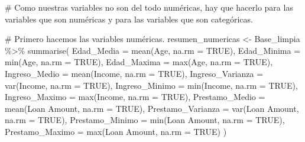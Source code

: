 \documentclass[
  letterpaper,
  DIV=11,
  numbers=noendperiod]{scrreprt}
\newenvironment{Shaded}{\begin{snugshade}}{\end{snugshade}}
\newcommand{\AttributeTok}[1]{\textcolor[rgb]{0.40,0.45,0.13}{#1}}
\newcommand{\CommentTok}[1]{\textcolor[rgb]{0.37,0.37,0.37}{#1}}
\newcommand{\ConstantTok}[1]{\textcolor[rgb]{0.56,0.35,0.01}{#1}}
\newcommand{\FunctionTok}[1]{\textcolor[rgb]{0.28,0.35,0.67}{#1}}
\newcommand{\NormalTok}[1]{\textcolor[rgb]{0.00,0.23,0.31}{#1}}
\newcommand{\OtherTok}[1]{\textcolor[rgb]{0.00,0.23,0.31}{#1}}
\newcommand{\SpecialCharTok}[1]{\textcolor[rgb]{0.37,0.37,0.37}{#1}}
\newcommand{\StringTok}[1]{\textcolor[rgb]{0.13,0.47,0.30}{#1}}
\begin{document}
\begin{Shaded}
\begin{Highlighting}[]
\CommentTok{\# Como nuestras variables no son del todo numéricas, hay que hacerlo para las variables que son numéricas y para las variables que son categóricas. }

\CommentTok{\# Primero hacemos las variables numéricas.}
\NormalTok{resumen\_numericas }\OtherTok{\textless{}{-}}\NormalTok{ Base\_limpia }\SpecialCharTok{\%\textgreater{}\%}
  \FunctionTok{summarise}\NormalTok{(}
    \AttributeTok{Edad\_Media =} \FunctionTok{mean}\NormalTok{(Age, }\AttributeTok{na.rm =} \ConstantTok{TRUE}\NormalTok{),}
    \AttributeTok{Edad\_Minima =} \FunctionTok{min}\NormalTok{(Age, }\AttributeTok{na.rm =} \ConstantTok{TRUE}\NormalTok{),}
    \AttributeTok{Edad\_Maxima =} \FunctionTok{max}\NormalTok{(Age, }\AttributeTok{na.rm =} \ConstantTok{TRUE}\NormalTok{),}
    \AttributeTok{Ingreso\_Medio =} \FunctionTok{mean}\NormalTok{(Income, }\AttributeTok{na.rm =} \ConstantTok{TRUE}\NormalTok{),}
    \AttributeTok{Ingreso\_Varianza =} \FunctionTok{var}\NormalTok{(Income, }\AttributeTok{na.rm =} \ConstantTok{TRUE}\NormalTok{),}
    \AttributeTok{Ingreso\_Minimo =} \FunctionTok{min}\NormalTok{(Income, }\AttributeTok{na.rm =} \ConstantTok{TRUE}\NormalTok{),}
    \AttributeTok{Ingreso\_Maximo =} \FunctionTok{max}\NormalTok{(Income, }\AttributeTok{na.rm =} \ConstantTok{TRUE}\NormalTok{),}
    \AttributeTok{Prestamo\_Medio =} \FunctionTok{mean}\NormalTok{(}\StringTok{\textasciigrave{}}\AttributeTok{Loan Amount}\StringTok{\textasciigrave{}}\NormalTok{, }\AttributeTok{na.rm =} \ConstantTok{TRUE}\NormalTok{),}
    \AttributeTok{Prestamo\_Varianza =} \FunctionTok{var}\NormalTok{(}\StringTok{\textasciigrave{}}\AttributeTok{Loan Amount}\StringTok{\textasciigrave{}}\NormalTok{, }\AttributeTok{na.rm =} \ConstantTok{TRUE}\NormalTok{),}
    \AttributeTok{Prestamo\_Minimo =} \FunctionTok{min}\NormalTok{(}\StringTok{\textasciigrave{}}\AttributeTok{Loan Amount}\StringTok{\textasciigrave{}}\NormalTok{, }\AttributeTok{na.rm =} \ConstantTok{TRUE}\NormalTok{),}
    \AttributeTok{Prestamo\_Maximo =} \FunctionTok{max}\NormalTok{(}\StringTok{\textasciigrave{}}\AttributeTok{Loan Amount}\StringTok{\textasciigrave{}}\NormalTok{, }\AttributeTok{na.rm =} \ConstantTok{TRUE}\NormalTok{)}
\NormalTok{  )}


\end{Highlighting}
\end{Shaded}
\end{document}
